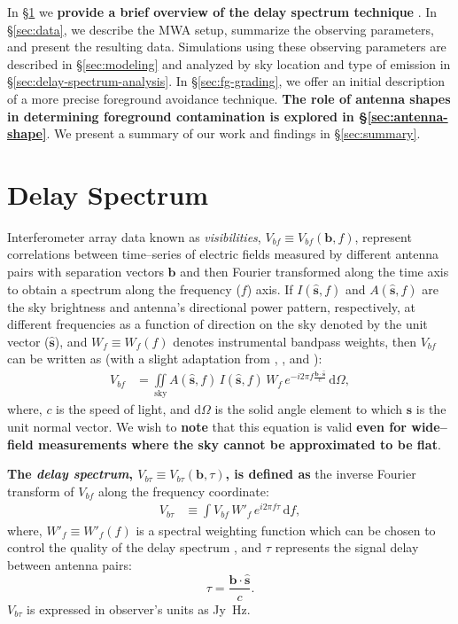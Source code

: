 \documentclass[preprint2,iop,numberedappendix]{emulateapj}
\newcommand{\dif}{\mathrm{d}}
\begin{document}
In \S\ref{sec:delay-spectrum} we {\bf provide a brief overview of the delay spectrum technique} \citep{par12a,par12b}. In \S\ref{sec:data}, we describe the MWA setup, summarize the observing parameters, and present the resulting data. Simulations using these observing parameters are described in \S\ref{sec:modeling} and analyzed by sky location and type of emission in \S\ref{sec:delay-spectrum-analysis}. In \S\ref{sec:fg-grading}, we offer an initial description of a more precise foreground avoidance technique. {\bf The role of antenna shapes in determining foreground contamination is explored in \S\ref{sec:antenna-shape}}. We present a summary of our work and findings in \S\ref{sec:summary}.

\section{Delay Spectrum}\label{sec:delay-spectrum}

Interferometer array data known as {\it visibilities}, $V_{bf}\equiv V_{bf}(\boldsymbol{b},f)$, represent correlations between time--series of electric fields measured by different antenna pairs with separation vectors $\boldsymbol{b}$ and then Fourier transformed along the time axis to obtain a spectrum along the frequency ($f$) axis. If $I(\hat{\boldsymbol{s}},f)$ and $A(\hat{\boldsymbol{s}},f)$ are the sky brightness and antenna's directional power pattern, respectively, at different frequencies as a function of direction on the sky denoted by the unit vector ($\hat{\boldsymbol{s}}$), and $W_f\equiv W_f(f)$ denotes instrumental bandpass weights, then $V_{bf}$ can be written as (with a slight adaptation from \citet{van34}, \citet{zer38}, and \citet{tho01}):
\begin{align}\label{eqn:obsvis}
  V_{bf} &= \iint\limits_\textrm{sky} A(\hat{\boldsymbol{s}},f)\,I(\hat{\boldsymbol{s}},f)\,W_f\,e^{-i2\pi f\frac{\boldsymbol{b}\cdot\hat{\boldsymbol{s}}}{c}}\,\dif\Omega,
\end{align}
where, $c$ is the speed of light, and $\dif\Omega$ is the solid angle element to which $\hat{\boldsymbol{s}}$ is the unit normal vector. We wish to {\bf note} that this equation is valid {\bf even for wide--field measurements where the sky cannot be approximated to be flat}.

{\bf The {\it delay spectrum}, $V_{b\tau}\equiv V_{b\tau}(\boldsymbol{b},\tau)$, is defined as} the inverse Fourier transform of $V_{bf}$ along the frequency coordinate:
\begin{align}\label{eqn:delay-transform}
  V_{b\tau} &\equiv \int V_{bf}\,W'_f\,e^{i2\pi f\tau}\,\dif f,
\end{align}
where, $W'_f\equiv W'_f(f)$ is a spectral weighting function which can be chosen to control the quality of the delay spectrum \citep{thy13,ved12}, and $\tau$ represents the signal delay between antenna pairs:
\begin{equation}\label{eqn:delay}
  \tau = \frac{\boldsymbol{b}\cdot\hat{\boldsymbol{s}}}{c}.
\end{equation}
$V_{b\tau}$ is expressed in observer's units as Jy~Hz.
\end{document}
